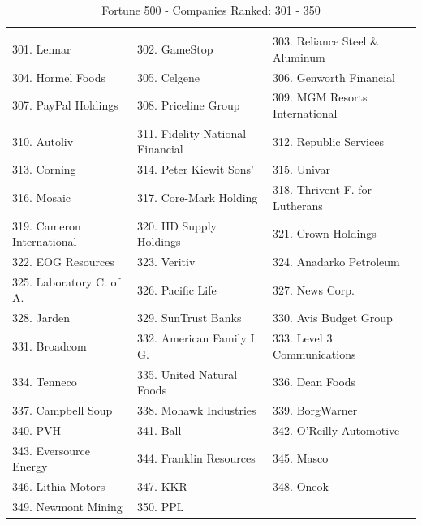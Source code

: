 \documentclass{book}
\begin{document}
\begin{table}[H]
\centering
\caption{Fortune 500 - Companies Ranked: 301 - 350}
\begin{tabular}{lll}
\hline
 \\ 301. Lennar 
&  302. GameStop 
&  303. Reliance Steel \& Aluminum 
\\ 304. Hormel Foods 
&  305. Celgene 
&  306. Genworth Financial 
\\ 307. PayPal Holdings 
&  308. Priceline Group 
&  309. MGM Resorts International 
\\ 310. Autoliv 
&  311. Fidelity National Financial 
&  312. Republic Services 
\\ 313. Corning 
&  314. Peter Kiewit Sons' 
&  315. Univar 
\\ 316. Mosaic 
&  317. Core-Mark Holding 
&  318. Thrivent F. for Lutherans 
\\ 319. Cameron International 
&  320. HD Supply Holdings 
&  321. Crown Holdings 
\\ 322. EOG Resources 
&  323. Veritiv 
&  324. Anadarko Petroleum 
\\ 325. Laboratory C. of A. 
&  326. Pacific Life 
&  327. News Corp. 
\\ 328. Jarden 
&  329. SunTrust Banks 
&  330. Avis Budget Group 
\\ 331. Broadcom 
&  332. American Family I. G. 
&  333. Level 3 Communications 
\\ 334. Tenneco 
&  335. United Natural Foods 
&  336. Dean Foods 
\\ 337. Campbell Soup 
&  338. Mohawk Industries 
&  339. BorgWarner 
\\ 340. PVH 
&  341. Ball 
&  342. O'Reilly Automotive 
\\ 343. Eversource Energy 
&  344. Franklin Resources 
&  345. Masco 
\\ 346. Lithia Motors 
&  347. KKR 
&  348. Oneok 
\\ 349. Newmont Mining 
&  350. PPL 
&   
 \\ \hline

\end{tabular}
\end{table}
\end{document}
